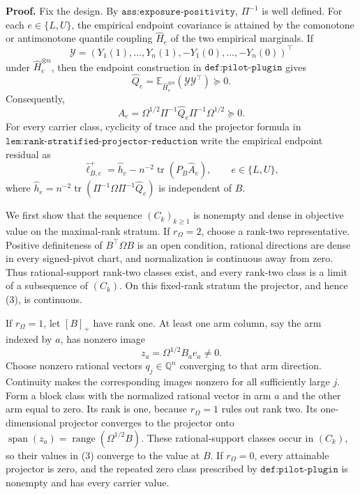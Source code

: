 \textbf{Proof.}
Fix the design.  By \(\texttt{ass:exposure-positivity}\), \(\Pi^{-1}\) is well defined.  For each \(e\in\{L,U\}\), the empirical endpoint covariance is attained by the comonotone or antimonotone quantile coupling \(\widehat H_e\) of the two empirical marginals.  If
\[
\mathcal Y=(Y_1(1),\ldots,Y_n(1),-Y_1(0),\ldots,-Y_n(0))^{\top}
\]
under \(\widehat H_e^{\otimes n}\), then the endpoint construction in \(\texttt{def:pilot-plugin}\) gives
\[
\widehat Q_e=\mathbb E_{\widehat H_e^{\otimes n}}(\mathcal Y\mathcal Y^{\top})\succeq0.
\tag{1}
\]
Consequently,
\[
\widehat A_e
=\Omega^{1/2}\Pi^{-1}\widehat Q_e\Pi^{-1}\Omega^{1/2}
\succeq0.
\tag{2}
\]
For every carrier class, cyclicity of trace and the projector formula in \(\texttt{lem:rank-stratified-projector-reduction}\) write the empirical endpoint residual as
\[
\widehat\ell_{B,e}^+
=\widehat h_e-n^{-2}\operatorname{tr}(P_B\widehat A_e),
\qquad e\in\{L,U\},
\tag{3}
\]
where \(\widehat h_e=n^{-2}\operatorname{tr}(\Pi^{-1}\Omega\Pi^{-1}\widehat Q_e)\) is independent of \(B\).

We first show that the sequence \((C_k)_{k\ge1}\) is nonempty and dense in objective value on the maximal-rank stratum.  If \(r_\Omega=2\), choose a rank-two representative.  Positive definiteness of \(B^{\top}\Omega B\) is an open condition, rational directions are dense in every signed-pivot chart, and normalization is continuous away from zero.  Thus rational-support rank-two classes exist, and every rank-two class is a limit of a subsequence of \((C_k)\).  On this fixed-rank stratum the projector, and hence (3), is continuous.

If \(r_\Omega=1\), let \([B]_+\) have rank one.  At least one arm column, say the arm indexed by \(a\), has nonzero image
\[
z_a=\Omega^{1/2}B_ae_a\ne0.
\]
Choose nonzero rational vectors \(q_j\in\mathbb Q^n\) converging to that arm direction.  Continuity makes the corresponding images nonzero for all sufficiently large \(j\).  Form a block class with the normalized rational vector in arm \(a\) and the other arm equal to zero.  Its rank is one, because \(r_\Omega=1\) rules out rank two.  Its one-dimensional projector converges to the projector onto
\(\operatorname{span}(z_a)=\operatorname{range}(\Omega^{1/2}B)\).  These rational-support classes occur in \((C_k)\), so their values in (3) converge to the value at \(B\).  If \(r_\Omega=0\), every attainable projector is zero, and the repeated zero class prescribed by \(\texttt{def:pilot-plugin}\) is nonempty and has every carrier value.

